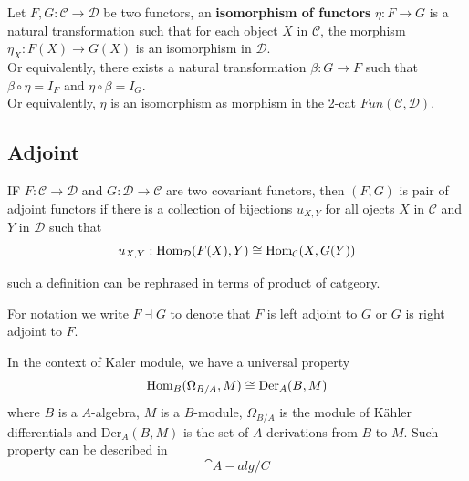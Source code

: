 \begin{colordefinition}
    Let \(F,G: \mathcal{C} \to \mathcal{D}\) be two functors, an \textbf{isomorphism of functors} \(\eta: F \to G\) is a natural transformation such that for each object \(X\) in \(\mathcal{C}\), the morphism \(\eta_X: F(X) \to G(X)\) is an isomorphism in \(\mathcal{D}\).\\

    Or equivalently, there exists a natural transformation \(\beta: G \to F\) such that \(\beta \circ \eta = I_F\) and \(\eta \circ \beta = I_G\).\\

    Or equivalently, \(\eta\) is an isomorphism as morphism in the 2-cat \(Fun(\mathcal{C},\mathcal{D})\).
\end{colordefinition}


\subsection{Adjoint}

\begin{definition}
    IF $F: \mathcal{C} \to \mathcal{D}$ and $G: \mathcal{D} \to \mathcal{C}$ are two covariant functors, then \((F,G)\) is pair of adjoint functors if there is a collection of bijections \(u_{X,Y}\) for all ojects \(X\) in \(\mathcal{C}\) and \(Y\) in \(\mathcal{D}\) such that
    \[u_{X,Y}: \operatorname{Hom}_{\mathcal{D}}(F(X), Y) \cong \operatorname{Hom}_{\mathcal{C}}(X, G(Y))\] 
\end{definition}

\begin{remark}
    such a definition can be rephrased in terms of product of catgeory.
\end{remark}

For notation we write \(F \dashv G\) to denote that \(F\) is left adjoint to \(G\) or \(G\) is right adjoint to \(F\).

\begin{example}
    In the context of Kaler module, we have a universal property 
    \[\operatorname{Hom}_B(\Omega_{B/A},M) \cong \mathrm{Der}_A(B,M)\]
    where \(B\) is a \(A\)-algebra, \(M\) is a \(B\)-module, \(\Omega_{B/A}\) is the module of Kähler differentials and \(\mathrm{Der}_A(B,M)\) is the set of \(A\)-derivations from \(B\) to \(M\). Such property can be described in 
    \[\cat{A-alg/C}{}{}\]
\end{example}